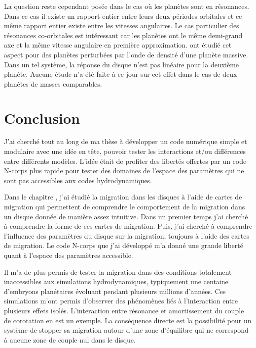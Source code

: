 La question reste cependant posée dans le cas où les planètes sont en résonances. Dans ce cas il existe un rapport entier entre leurs deux périodes orbitales et ce même rapport entier existe entre les vitesses angulaires. Le cas particulier des résonances co-orbitales est intéressant car les planètes ont le même demi-grand axe et la même vitesse angulaire en première approximation. \cite{podlewska2012outward, baruteau2013disk} ont étudié cet aspect pour des planètes perturbées par l'onde de densité d'une planète massive. Dans un tel système, la réponse du disque n'est pas linéaire pour la deuxième planète. Aucune étude n'a été faite à ce jour sur cet effet dans le cas de deux planètes de masses comparables. 

\section{Conclusion}
J'ai cherché tout au long de ma thèse à développer un code numérique simple et modulaire avec une idée en tête, pouvoir tester les interactions et/ou différences entre différents modèles. L'idée était de profiter des libertés offertes par un code N-corps plus rapide pour tester des domaines de l'espace des paramètres qui ne sont pas accessibles aux codes hydrodynamiques. 

\bigskip

Dans le chapitre , j'ai étudié la migration dans les disques à l'aide de cartes de migration qui permettent de comprendre le comportement de la migration dans un disque donnée de manière assez intuitive. Dans un premier temps j'ai cherché à comprendre la forme de ces cartes de migration. Puis, j'ai cherché à comprendre l'influence des paramètres du disque sur la migration, toujours à l'aide des cartes de migration. Le code N-corps que j'ai développé m'a donné une grande liberté quant à l'espace des paramètres accessible. 

Il m'a de plus permis de tester la migration dans des conditions totalement inaccessibles aux simulations hydrodynamiques, typiquement une centaine d'embryons planétaires évoluant pendant plusieurs millions d'années. Ces simulations m'ont permis d'observer des phénomènes liés à l'interaction entre plusieurs effets isolés. L'interaction entre résonance et amortissement du couple de corotation en est un exemple. La conséquence directe est la possibilité pour un système de stopper sa migration autour d'une zone d'équilibre qui ne correspond à aucune zone de couple nul dans le disque. 

